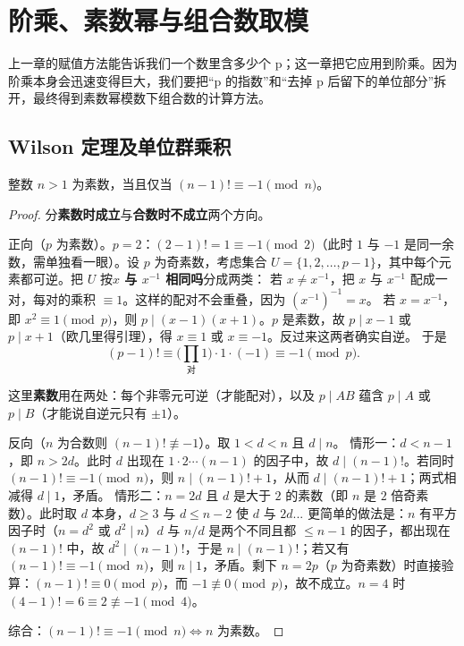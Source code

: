 \chapter{阶乘、素数幂与组合数取模}
\begin{chapterintro}[章节导读]
上一章的赋值方法能告诉我们一个数里含多少个 p；这一章把它应用到阶乘。因为阶乘本身会迅速变得巨大，我们要把“p 的指数”和“去掉 p 后留下的单位部分”拆开，最终得到素数幂模数下组合数的计算方法。
\end{chapterintro}

\section{Wilson 定理及单位群乘积}
\begin{theorem}[Wilson 定理]
整数 $n>1$ 为素数，当且仅当 $(n-1)!\equiv-1\pmod n$。
\end{theorem}
\begin{proof}
分\textbf{素数时成立}与\textbf{合数时不成立}两个方向。

正向（$p$ 为素数）。$p=2$：$(2-1)!=1\equiv-1\pmod2$（此时 $1$ 与 $-1$ 是同一余数，需单独看一眼）。设 $p$ 为奇素数，考虑集合 $U=\{1,2,\ldots,p-1\}$，其中每个元素都可逆。把 $U$ 按\textbf{$x$ 与 $x^{-1}$ 相同吗}分成两类：
若 $x\ne x^{-1}$，把 $x$ 与 $x^{-1}$ 配成一对，每对的乘积 $\equiv1$。这样的配对不会重叠，因为 $(x^{-1})^{-1}=x$。
若 $x=x^{-1}$，即 $x^2\equiv1\pmod p$，则 $p\mid(x-1)(x+1)$。$p$ 是素数，故 $p\mid x-1$ 或 $p\mid x+1$（欧几里得引理），得 $x\equiv1$ 或 $x\equiv-1$。反过来这两者确实自逆。
于是
\[
 (p-1)!\equiv\Big(\prod_{\text{对}}1\Big)\cdot1\cdot(-1)\equiv-1\pmod p .
\]



这里\textbf{素数}用在两处：每个非零元可逆（才能配对），以及 $p\mid AB$ 蕴含 $p\mid A$ 或 $p\mid B$（才能说自逆元只有 $\pm1$）。

反向（$n$ 为合数则 $(n-1)!\not\equiv-1$）。取 $1<d<n$ 且 $d\mid n$。
情形一：$d<n-1$，即 $n>2d$。此时 $d$ 出现在 $1\cdot2\cdots(n-1)$ 的因子中，故 $d\mid(n-1)!$。若同时 $(n-1)!\equiv-1\pmod n$，则 $n\mid(n-1)!+1$，从而 $d\mid(n-1)!+1$；两式相减得 $d\mid1$，矛盾。
情形二：$n=2d$ 且 $d$ 是大于 $2$ 的素数（即 $n$ 是 $2$ 倍奇素数）。此时取 $d$ 本身，$d\ge3$ 与 $d\le n-2$ 使 $d$ 与 $2d$... 更简单的做法是：$n$ 有平方因子时（$n=d^2$ 或 $d^2\mid n$）$d$ 与 $n/d$ 是两个不同且都 $\le n-1$ 的因子，都出现在 $(n-1)!$ 中，故 $d^2\mid(n-1)!$，于是 $n\mid(n-1)!$；若又有 $(n-1)!\equiv-1\pmod n$，则 $n\mid1$，矛盾。剩下 $n=2p$（$p$ 为奇素数）时直接验算：$(n-1)!\equiv0\pmod p$，而 $-1\not\equiv0\pmod p$，故不成立。$n=4$ 时 $(4-1)!=6\equiv2\not\equiv-1\pmod4$。

综合：$(n-1)!\equiv-1\pmod n\iff n$ 为素数。
\end{proof}

